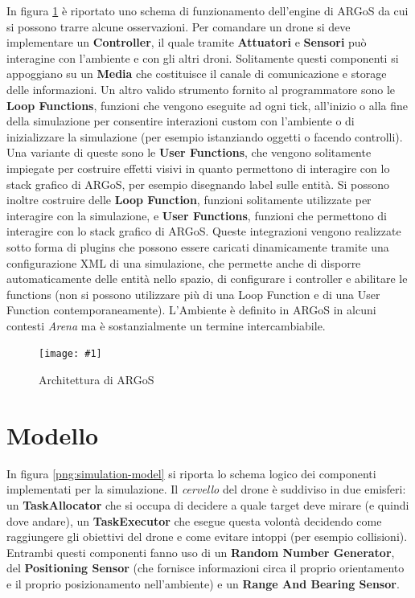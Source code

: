 \documentclass[a4paper,11pt,oneside, table]{article}
\newcommand{\putimage}[4] {
	\begin{figure}[H]
	    \centering
	    \texttt{[image: \#1]}
	    \caption{#2}\label{#3}
	\end{figure}
}
\begin{document}
In figura \ref{png:architecture} \`e riportato uno schema di funzionamento dell'engine di ARGoS da cui si possono trarre alcune osservazioni.
Per comandare un drone si deve implementare un \textbf{Controller}, il quale tramite \textbf{Attuatori} e \textbf{Sensori} pu\`o interagine con l'ambiente e con gli altri droni.
Solitamente questi componenti si appoggiano su un \textbf{Media} che costituisce il canale di comunicazione e storage delle informazioni.
Un altro valido strumento fornito al programmatore sono le \textbf{Loop Functions}, funzioni che vengono eseguite ad ogni tick, all'inizio o alla fine della simulazione per consentire interazioni custom con l'ambiente o di inizializzare la simulazione (per esempio istanziando oggetti o facendo controlli).
Una variante di queste sono le \textbf{User Functions}, che vengono solitamente impiegate per costruire effetti visivi in quanto permettono di interagire con lo stack grafico di ARGoS, per esempio disegnando label sulle entit\`a.
Si possono inoltre costruire delle \textbf{Loop Function}, funzioni solitamente utilizzate per interagire con la simulazione, e \textbf{User Functions}, funzioni che permettono di interagire con lo stack grafico di ARGoS.
Queste integrazioni vengono realizzate sotto forma di plugins che possono essere caricati dinamicamente tramite una configurazione XML di una simulazione, che permette anche di disporre automaticamente delle entit\`a nello spazio, di configurare i controller e abilitare le functions (non si possono utilizzare pi\`u di una Loop Function e di una User Function contemporaneamente).
L'Ambiente \`e definito in ARGoS in alcuni contesti \textit{Arena} ma \`e sostanzialmente un termine intercambiabile.

\putimage{images/architecture.png}{Architettura di ARGoS}{png:architecture}{0.99}

\section{Modello}

In figura \ref{png:simulation-model} si riporta lo schema logico dei componenti implementati per la simulazione.
Il \textit{cervello} del drone \`e suddiviso in due emisferi: un \textbf{TaskAllocator} che si occupa di decidere a quale target deve mirare (e quindi dove andare), un \textbf{TaskExecutor} che esegue questa volont\`a decidendo come raggiungere gli obiettivi del drone e come evitare intoppi (per esempio collisioni).
Entrambi questi componenti fanno uso di un \textbf{Random Number Generator}, del \textbf{Positioning Sensor} (che fornisce informazioni circa il proprio orientamento e il proprio posizionamento nell'ambiente) e un \textbf{Range And Bearing Sensor}.
\end{document}
